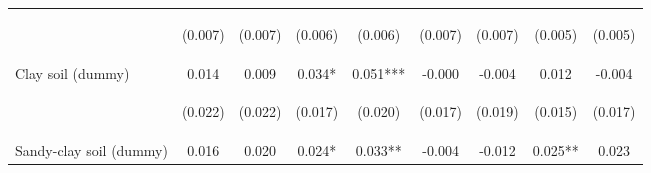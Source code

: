 \begin{center}
\begin{tabular}{lcccccccc}
\vspace{4pt} & \begin{footnotesize}(0.007)\end{footnotesize} & \begin{footnotesize}(0.007)\end{footnotesize} & \begin{footnotesize}(0.006)\end{footnotesize} & \begin{footnotesize}(0.006)\end{footnotesize} & \begin{footnotesize}(0.007)\end{footnotesize} & \begin{footnotesize}(0.007)\end{footnotesize} & \begin{footnotesize}(0.005)\end{footnotesize} & \begin{footnotesize}(0.005)\end{footnotesize} \\
Clay soil (dummy) & 0.014 & 0.009 & 0.034* & 0.051*** & -0.000 & -0.004 & 0.012 & -0.004 \\
\vspace{4pt} & \begin{footnotesize}(0.022)\end{footnotesize} & \begin{footnotesize}(0.022)\end{footnotesize} & \begin{footnotesize}(0.017)\end{footnotesize} & \begin{footnotesize}(0.020)\end{footnotesize} & \begin{footnotesize}(0.017)\end{footnotesize} & \begin{footnotesize}(0.019)\end{footnotesize} & \begin{footnotesize}(0.015)\end{footnotesize} & \begin{footnotesize}(0.017)\end{footnotesize} \\
Sandy-clay soil (dummy) & 0.016 & 0.020 & 0.024* & 0.033** & -0.004 & -0.012 & 0.025** & 0.023 \\

\end{tabular}
\end{center}
